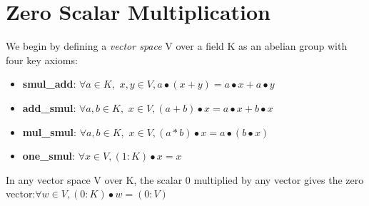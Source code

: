 \section{Zero Scalar Multiplication}

\begin{definition}
  \label{definition : VectorSpace}
  \leanok
  We begin by defining a \emph{vector space} V over a field K as an abelian group with four key axioms:
  \begin{itemize}
    \item \textbf{smul\_add}:
    $\forall a \in K,$ $x,y \in V , a \bullet (x + y) = a \bullet x + a \bullet y $
    \item \textbf{add\_smul}:
    $\forall a,b \in K,$ $x \in V, (a + b) \bullet x = a \bullet x + b \bullet x $
    \item \textbf{mul\_smul}:
    $\forall a,b \in K,$ $x \in V, (a * b) \bullet x = a \bullet (b \bullet x) $
    \item \textbf{one\_smul}:
    $\forall x \in V, (1 : K) \bullet x = x $
  \end{itemize}
\end{definition}

\begin{theorem}
  \label{theorem : zero_smul}
  \leanok
  In any vector space V over K, the scalar 0 multiplied by any vector gives the zero vector:$\forall w \in V, (0 : K) • w = (0 : V)$
\end{theorem}
